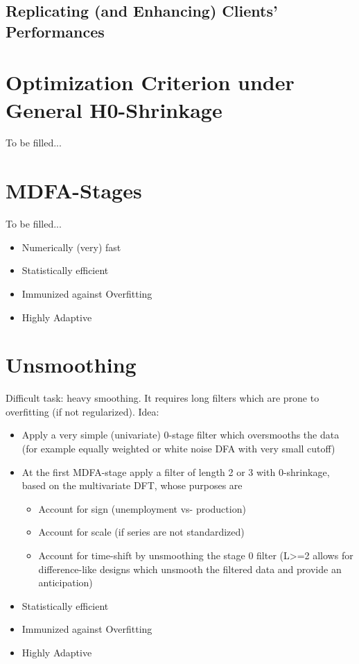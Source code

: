\documentclass[a4paper]{book}
\begin{document}
\subsection{Replicating (and Enhancing) Clients' Performances}

\section{Optimization Criterion under General H0-Shrinkage}

To be filled...


\section{MDFA-Stages}

To be filled...

\begin{itemize}
\item Numerically (very) fast
\item Statistically efficient
\item Immunized against Overfitting
\item Highly Adaptive
\end{itemize}



\section{Unsmoothing}

Difficult task: heavy smoothing. It requires long filters which are prone to overfitting (if not regularized). Idea:
\begin{itemize}
\item Apply a very simple (univariate) 0-stage filter which oversmooths the data (for example equally weighted or white noise DFA with very small cutoff)
\item At the first MDFA-stage apply a filter of length 2 or 3 with 0-shrinkage, based on the multivariate DFT, whose purposes are
\begin{itemize}
\item Account for sign (unemployment vs- production)
\item Account for scale (if series are not standardized)
\item Account for time-shift by unsmoothing the stage 0 filter (L>=2 allows for difference-like designs which unsmooth the filtered data and provide an anticipation)
\end{itemize}
\item Statistically efficient
\item Immunized against Overfitting
\item Highly Adaptive
\end{itemize}
\end{document}
